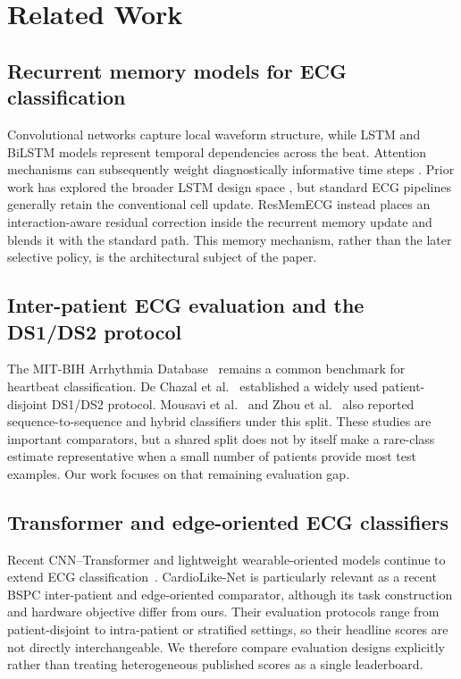 \documentclass[pdflatex,sn-mathphys-num]{sn-jnl}
\begin{document}
\section{Related Work}
\subsection{Recurrent memory models for ECG classification}
Convolutional networks capture local waveform structure, while LSTM and BiLSTM
models represent temporal dependencies across the beat. Attention mechanisms
can subsequently weight diagnostically informative time steps
\cite{RN8,RN16}. Prior work has explored the broader LSTM design space
\cite{RN10,RN11}, but standard ECG pipelines generally retain the conventional
cell update. ResMemECG instead places an interaction-aware residual correction
inside the recurrent memory update and blends it with the standard path. This
memory mechanism, rather than the later selective policy, is the architectural
subject of the paper.

\subsection{Inter-patient ECG evaluation and the DS1/DS2 protocol}
The MIT-BIH Arrhythmia Database~\cite{RN20} remains a common benchmark for
heartbeat classification. De Chazal et al.~\cite{RN21} established a widely
used patient-disjoint DS1/DS2 protocol. Mousavi et al.~\cite{ref29} and Zhou
et al.~\cite{ref30} also reported sequence-to-sequence and hybrid classifiers
under this split.
These studies are important comparators, but a shared split does not by itself
make a rare-class estimate representative when a small number of patients
provide most test examples. Our work focuses on that remaining evaluation gap.

\subsection{Transformer and edge-oriented ECG classifiers}
Recent CNN--Transformer and lightweight wearable-oriented models continue to
extend ECG classification~\cite{ref31,ref32,li2025modwpt,xu2026cardiolike}.
CardioLike-Net is particularly relevant as a recent BSPC inter-patient and
edge-oriented comparator, although its task construction and hardware objective
differ from ours. Their evaluation protocols range
from patient-disjoint to intra-patient or stratified settings, so their headline
scores are not directly interchangeable. We therefore compare evaluation
designs explicitly rather than treating heterogeneous published scores as a
single leaderboard.
\end{document}

